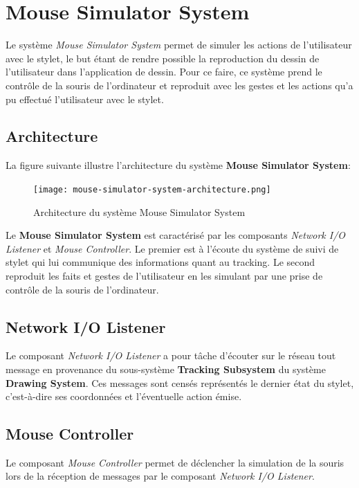 \documentclass[11pt,a4paper,oldfontcommands]{memoir}
\begin{document}
\newpage

\section{Mouse Simulator System}

Le système \textit{Mouse Simulator System} permet de simuler les actions de l'utilisateur avec le stylet, le but étant de rendre possible la reproduction du dessin de l'utilisateur dans l'application de dessin. Pour ce faire, ce système prend le contrôle de la souris de l'ordinateur et reproduit avec les gestes et les actions qu'a pu effectué l'utilisateur avec le stylet.

\subsection{Architecture}

La figure suivante illustre l'architecture du système \textbf{Mouse Simulator System}:

\begin{figure}[H]
\centering
\texttt{[image: mouse-simulator-system-architecture.png]}
\caption{Architecture du système Mouse Simulator System}
\end{figure}

Le \textbf{Mouse Simulator System} est caractérisé par les composants \textit{Network I/O Listener} et \textit{Mouse Controller}. Le premier est à l'écoute du système de suivi de stylet qui lui communique des informations quant au tracking. Le second reproduit les faits et gestes de l'utilisateur en les simulant par une prise de contrôle de la souris de l'ordinateur.

\subsection{Network I/O Listener}

Le composant \textit{Network I/O Listener} a pour tâche d'écouter sur le réseau tout message en provenance du sous-système \textbf{Tracking Subsystem} du système \textbf{Drawing System}. Ces messages sont censés représentés le dernier état du stylet, c'est-à-dire ses coordonnées et l'éventuelle action émise.

\subsection{Mouse Controller}

Le composant \textit{Mouse Controller} permet de déclencher la simulation de la souris lors de la réception de messages par le composant \textit{Network I/O Listener}.
\end{document}
